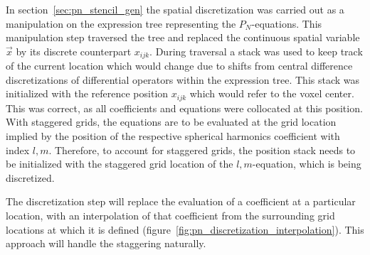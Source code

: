 In section~\ref{sec:pn_stencil_gen} the spatial discretization was carried out as a manipulation on the expression tree representing the $P_N$-equations. This manipulation step traversed the tree and replaced the continuous spatial variable $\vec{x}$ by its discrete counterpart $x_{ijk}$. During traversal a stack was used to keep track of the current location which would change due to shifts from central difference discretizations of differential operators within the expression tree. This stack was initialized with the reference position $x_{ijk}$ which would refer to the voxel center. This was correct, as all coefficients and equations were collocated at this position. With staggered grids, the equations are to be evaluated at the grid location implied by the position of the respective spherical harmonics coefficient with index $l,m$. Therefore, to account for staggered grids, the position stack needs to be initialized with the staggered grid location of the $l,m$-equation, which is being discretized.

The discretization step will replace the evaluation of a coefficient at a particular location, with an interpolation of that coefficient from the surrounding grid locations at which it is defined (figure~\ref{fig:pn_discretization_interpolation}). This approach will handle the staggering naturally.

